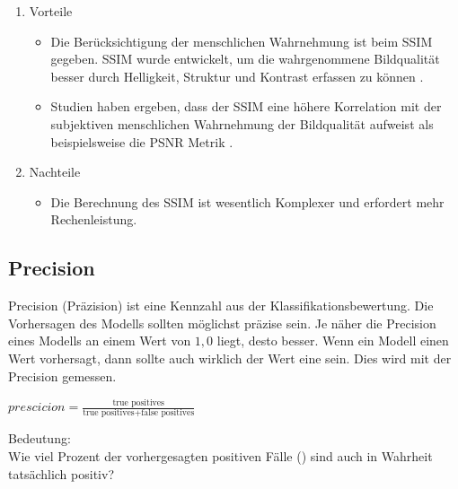             \begin{enumerate}
                \item Vorteile
                \begin{itemize}
                    \item Die Berücksichtigung der menschlichen Wahrnehmung ist beim SSIM gegeben. SSIM wurde entwickelt, um die wahrgenommene Bildqualität besser durch Helligkeit, Struktur und Kontrast erfassen zu können 
                    \cite{wikipedia_ssim}.
                    \item Studien haben ergeben, dass der SSIM eine höhere Korrelation mit der subjektiven menschlichen Wahrnehmung der Bildqualität aufweist als beispielsweise die PSNR Metrik \cite{wikipedia_ssim}.
                \end{itemize}
                \item Nachteile
                \begin{itemize}
                    \item Die Berechnung des SSIM ist wesentlich Komplexer und erfordert mehr Rechenleistung.
                \end{itemize}
            \end{enumerate}    

\newpage
    \subsection{Precision}
            Precision (Präzision) ist eine Kennzahl aus der Klassifikationsbewertung.
            Die Vorhersagen des Modells sollten möglichst präzise sein. Je näher die Precision eines Modells an einem Wert von $1,0$ liegt, desto besser.
            Wenn ein Modell einen Wert  vorhersagt, dann sollte auch wirklich der Wert eine  sein.
            Dies wird mit der Precision gemessen.\newline
            \begin{center}  
                \large$prescicion = \frac{\text{true positives}}{\text{true positives} + \text{false positives}}$\\
            \end{center}
            Bedeutung:\\
            Wie viel Prozent der vorhergesagten positiven Fälle () sind auch in Wahrheit tatsächlich positiv?
            \bigskip
            

